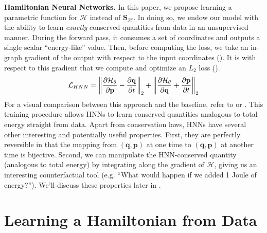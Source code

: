 \documentclass{article}
\begin{document}
\textbf{Hamiltonian Neural Networks.} In this paper, we propose learning a parametric function for $\mathcal{H}$ instead of $\mathbf{S_{\mathcal{H}}}$. In doing so, we endow our model with the ability to learn \textit{exactly} conserved quantities from data in an unsupervised manner. During the forward pass, it consumes a set of coordinates and outputs a single scalar ``energy-like'' value. Then, before computing the loss, we take an in-graph gradient of the output with respect to the input coordinates (). It is with respect to this gradient that we compute and optimize an $L_2$ loss ().
\begin{equation}
\mathcal{L}_{HNN} =  \bigg \Vert \frac{\partial \mathcal{H_{\theta}}}{ \partial \mathbf{p}} - \frac{\partial \mathbf{q}}{\partial t}  \bigg \Vert _2 +  \bigg \Vert \frac{\partial \mathcal{H_{\theta}}}{ \partial \mathbf{q}} + \frac{\partial \mathbf{p}}{\partial t}  \bigg \Vert_2
\eqnlabel{eqn3}
\end{equation}
For a visual comparison between this approach and the baseline, refer to  or . This training procedure allows HNNs to learn conserved quantities analogous to total energy straight from data. Apart from conservation laws, HNNs have several other interesting and potentially useful properties. First, they are perfectly reversible in that the mapping from $(\mathbf{q},\mathbf{p})$ at one time to $(\mathbf{q},\mathbf{p})$ at another time is bijective. Second, we can manipulate the HNN-conserved quantity (analogous to total energy) by integrating along the gradient of $\mathcal{H}$, giving us an interesting counterfactual tool (e.g. ``What would happen if we added 1 Joule of energy?''). We'll discuss these properties later in .




\section{Learning a Hamiltonian from Data} 
\end{document}
